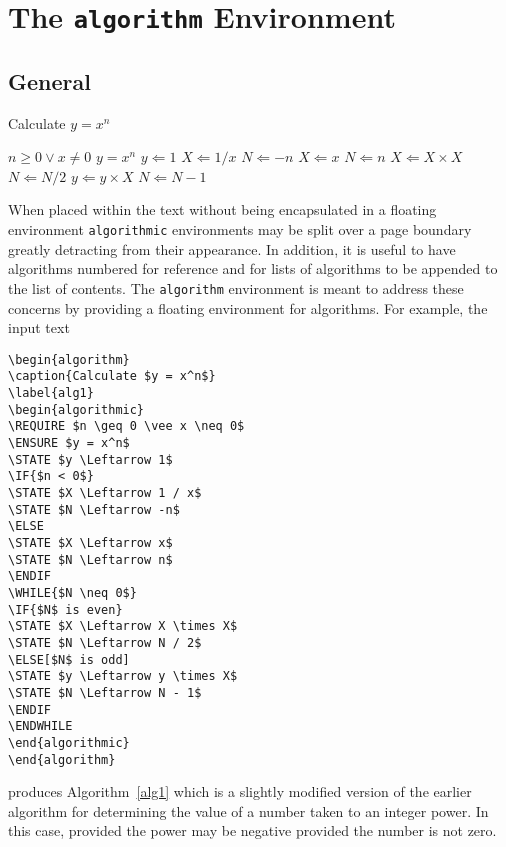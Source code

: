 \documentclass{article}
\newcommand{\keyword}[1]{\texttt{#1}}
\begin{document}
\section{The \keyword{algorithm} Environment}

\subsection{General}
\begin{algorithm}
\caption{Calculate $y = x^n$}
\label{alg1}
\begin{algorithmic}
\REQUIRE $n \geq 0 \vee x \neq 0$
\ENSURE $y = x^n$
\STATE $y \Leftarrow 1$
\STATE $X \Leftarrow 1 / x$
\STATE $N \Leftarrow -n$
\ELSE
\STATE $X \Leftarrow x$
\STATE $N \Leftarrow n$
\ENDIF
{}
\STATE $X \Leftarrow X \times X$
\STATE $N \Leftarrow N / 2$
\ELSE[$N$ is odd]
\STATE $y \Leftarrow y \times X$
\STATE $N \Leftarrow N - 1$
\ENDIF
\ENDWHILE
\end{algorithmic}
\end{algorithm}

When placed within the text without being encapsulated in a floating
environment \texttt{algorithmic} environments may be split over a page
boundary greatly detracting from their appearance.
In addition, it is useful to have algorithms numbered for reference
and for lists of algorithms to be appended to the list of contents.
The \texttt{algorithm} environment is meant to address these concerns
by providing a floating environment for algorithms.
For example, the input text
\begin{verbatim}
\begin{algorithm}
\caption{Calculate $y = x^n$}
\label{alg1}
\begin{algorithmic}
\REQUIRE $n \geq 0 \vee x \neq 0$
\ENSURE $y = x^n$
\STATE $y \Leftarrow 1$
\IF{$n < 0$}
\STATE $X \Leftarrow 1 / x$
\STATE $N \Leftarrow -n$
\ELSE
\STATE $X \Leftarrow x$
\STATE $N \Leftarrow n$
\ENDIF
\WHILE{$N \neq 0$}
\IF{$N$ is even}
\STATE $X \Leftarrow X \times X$
\STATE $N \Leftarrow N / 2$
\ELSE[$N$ is odd]
\STATE $y \Leftarrow y \times X$
\STATE $N \Leftarrow N - 1$
\ENDIF
\ENDWHILE
\end{algorithmic}
\end{algorithm}
\end{verbatim}
produces Algorithm~\ref{alg1} which is a slightly modified version of
the earlier algorithm for determining the value of a number taken to an
integer power.
In this case, provided the power may be negative provided the number is
not zero.
\end{document}
